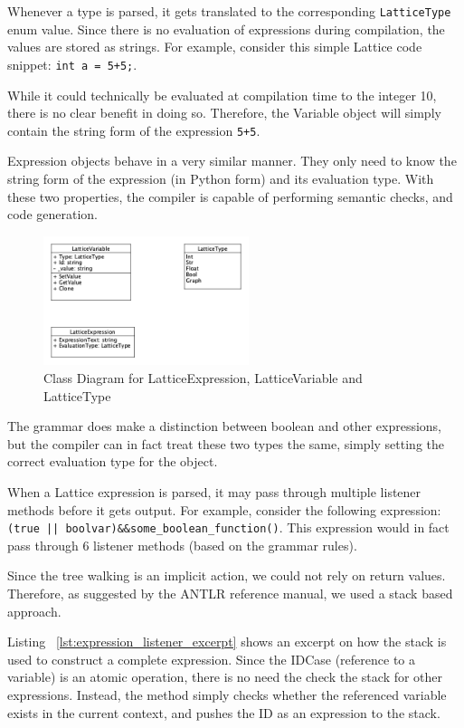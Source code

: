 Whenever a type is parsed, it gets translated to the corresponding \lstinline{LatticeType} enum value.
Since there is no evaluation of expressions during compilation, the values are stored as strings.
For example, consider this simple Lattice code snippet: \lstinline{int a = 5+5;}.

While it could technically be evaluated at compilation time to the integer 10, there is no clear benefit in doing so.
Therefore, the Variable object will simply contain the string form of the expression \lstinline{5+5}.

Expression objects behave in a very similar manner.
They only need to know the string form of the expression (in Python form) and its evaluation type.
With these two properties, the compiler is capable of performing semantic checks, and code generation.

\begin{figure}[H]
    \centering
    \includegraphics[width=6cm]{figures/implementation_section/varexprtype}
    \caption{Class Diagram for LatticeExpression, LatticeVariable and LatticeType}
    \label{fig:exprs-vars-types}
\end{figure}

The grammar does make a distinction between boolean and other expressions, but the compiler can in fact
treat these two types the same, simply setting the correct evaluation type for the object.

When a Lattice expression is parsed, it may pass through multiple listener methods before it gets output.
For example, consider the following expression: \lstinline{(true || boolvar)&&some_boolean_function()}.
This expression would in fact pass through 6 listener methods (based on the grammar rules).

Since the tree walking is an implicit action, we could not rely on return values.
Therefore, as suggested by the ANTLR reference manual, we used a stack based approach.

Listing ~\ref{lst:expression_listener_excerpt} shows an excerpt on how the stack is used to construct a complete expression.
Since the IDCase (reference to a variable) is an atomic operation, there is no need the check the stack for other expressions.
Instead, the method simply checks whether the referenced variable exists in the current context, and pushes the
ID as an expression to the stack.

